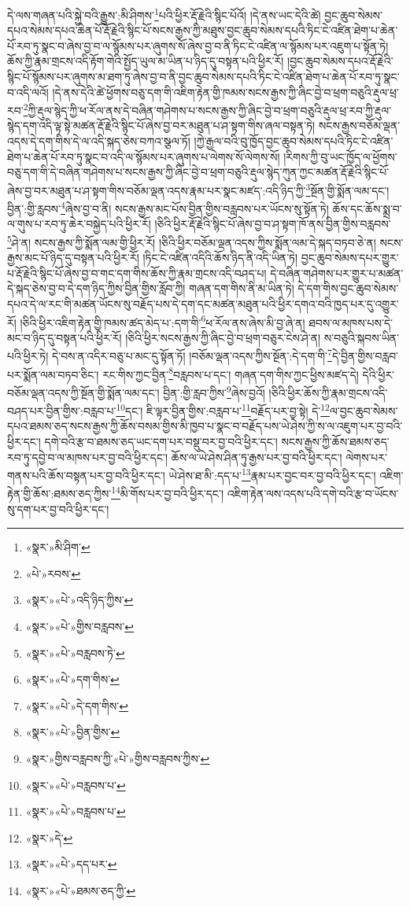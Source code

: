 དེ་ལས་གཞན་པའི་སྐྱེ་བའི་རྒྱུས་:མི་ཤིགས་\footnote{«སྣར་»མི་ཤིག་}པའི་ཕྱིར་རྡོ་རྗེའི་སྙིང་པོའོ། །དེ་ནས་ཡང་དེའི་ཚེ། བྱང་ཆུབ་སེམས་དཔའ་སེམས་དཔའ་ཆེན་པོ་རྡོ་རྗེའི་སྙིང་པོ་སངས་རྒྱས་ཀྱི་མཐུས་བྱང་ཆུབ་སེམས་དཔའི་ཏིང་ངེ་འཛིན་ཐེག་པ་ཆེན་པོ་རབ་ཏུ་སྣང་བ་ཞེས་བྱ་བ་ལ་སྙོམས་པར་ཞུགས་སོ་ཞེས་བྱ་བ་ནི་ཏིང་ངེ་འཛིན་ལ་སྙོམས་པར་འཇུག་པ་སྟོན་ཏེ། ཆོས་ཀྱི་རྣམ་གྲངས་འདི་རྟོག་གེའི་སྤྱོད་ཡུལ་མ་ཡིན་པ་ཉིད་དུ་བསྟན་པའི་ཕྱིར་རོ། །བྱང་ཆུབ་སེམས་དཔའ་རྡོ་རྗེའི་སྙིང་པོ་སྙོམས་པར་ཞུགས་མ་ཐག་ཏུ་ཞེས་བྱ་བ་ནི་བྱང་ཆུབ་སེམས་དཔའི་ཏིང་ངེ་འཛིན་ཐེག་པ་ཆེན་པོ་རབ་ཏུ་སྣང་བ་འདི་ལའོ། །དེ་ནས་དེའི་ཚེ་ཕྱོགས་བཅུ་དག་གི་འཇིག་རྟེན་གྱི་ཁམས་སངས་རྒྱས་ཀྱི་ཞིང་བྱེ་བ་ཕྲག་བཅུའི་རྡུལ་ཕྲ་རབ་\footnote{«པེ་»རབས་}ཀྱི་རྡུལ་སྙེད་ཀྱི་ཕ་རོལ་ནས་དེ་བཞིན་གཤེགས་པ་སངས་རྒྱས་ཀྱི་ཞིང་བྱེ་བ་ཕྲག་བཅུའི་རྡུལ་ཕྲ་རབ་ཀྱི་རྡུལ་སྙེད་དག་འདི་ལྟ་སྟེ་མཚན་རྡོ་རྗེའི་སྙིང་པོ་ཞེས་བྱ་བར་མཐུན་པ་ཤ་སྟག་གིས་ཞལ་བསྟན་ཏེ། སངས་རྒྱས་བཅོམ་ལྡན་འདས་དེ་དག་གིས་དེ་ལ་འདི་སྐད་ཅེས་བཀའ་སྩལ་ཏོ། །ཀྱེ་རྒྱལ་བའི་བུ་ཁྱོད་བྱང་ཆུབ་སེམས་དཔའི་ཏིང་ངེ་འཛིན་ཐེག་པ་ཆེན་པོ་རབ་ཏུ་སྣང་བ་འདི་ལ་སྙོམས་པར་ཞུགས་པ་ལེགས་སོ་ལེགས་སོ། །རིགས་ཀྱི་བུ་ཡང་ཁྱོད་ལ་ཕྱོགས་བཅུ་དག་གི་དེ་བཞིན་གཤེགས་པ་སངས་རྒྱས་ཀྱི་ཞིང་བྱེ་བ་ཕྲག་བཅུའི་རྡུལ་སྙེད་ཀུན་ཀྱང་མཚན་རྡོ་རྗེའི་སྙིང་པོ་ཞེས་བྱ་བར་མཐུན་པ་ཤ་སྟག་གིས་བཅོམ་ལྡན་འདས་རྣམ་པར་སྣང་མཛད་:འདི་ཉིད་ཀྱི་\footnote{«སྣར་»«པེ་»འདི་ཉིད་ཀྱིས་}སྔོན་གྱི་སྨོན་ལམ་དང་། བྱིན་:གྱི་རླབས་\footnote{«སྣར་»«པེ་»གྱིས་བརླབས་}ཞེས་བྱ་བ་ནི། སངས་རྒྱས་མང་པོས་བྱིན་གྱིས་བརླབས་པར་ཡོངས་སུ་སྟོན་ཏེ། ཆོས་དང་ཆོས་སྨྲ་བ་ལ་གུས་པ་རབ་ཏུ་ཆེར་བསྐྱེད་པའི་ཕྱིར་རོ། །ཅིའི་ཕྱིར་རྡོ་རྗེའི་སྙིང་པོ་ཞེས་བྱ་བ་ཤ་སྟག་ཁོ་ནས་བྱིན་གྱིས་བརླབས་\footnote{«སྣར་»«པེ་»བརླབས་ཏེ་}ཤེ་ན། སངས་རྒྱས་ཀྱི་སྨོན་ལམ་གྱི་ཕྱིར་རོ། །ཅིའི་ཕྱིར་བཅོམ་ལྡན་འདས་ཀྱིས་སྨོན་ལམ་དེ་སྐད་བཏབ་ཅེ་ན། སངས་རྒྱས་མང་པོ་ཉིད་དུ་བསྟན་པའི་ཕྱིར་རོ། །ཏིང་ངེ་འཛིན་འདིའི་ཆོས་ཉིད་ནི་འདི་ཡིན་ཏེ། བྱང་ཆུབ་སེམས་དཔར་གྱུར་པ་རྡོ་རྗེའི་སྙིང་པོ་ཞེས་བྱ་བ་གང་དག་གིས་ཆོས་ཀྱི་རྣམ་གྲངས་འདི་བཤད་པ། དེ་བཞིན་གཤེགས་པར་གྱུར་པ་མཚན་དེ་སྐད་ཅེས་བྱ་བ་དེ་དག་ཉིད་ཀྱིས་བྱིན་གྱིས་རློབ་ཀྱི། གཞན་དག་གིས་ནི་མ་ཡིན་ཏེ། དེ་དག་གིས་བྱང་ཆུབ་སེམས་དཔའ་དེ་ལ་རང་གི་མཚན་ཡོངས་སུ་བརྗོད་པས་དེ་དག་དང་མཚན་མཐུན་པའི་ཕྱིར་དགའ་བའི་ཁྱད་པར་དུ་འགྱུར་རོ། །ཅིའི་ཕྱིར་འཇིག་རྟེན་གྱི་ཁམས་ཚད་མེད་པ་:དག་གི་\footnote{«སྣར་»«པེ་»དག་གིས་}ཕ་རོལ་ནས་ཞེས་མི་བྱ་ཞེ་ན། ཐབས་ལ་མཁས་པས་དེ་མང་བ་ཉིད་དུ་བསྟན་པའི་ཕྱིར་རོ། །ཅིའི་ཕྱིར་སངས་རྒྱས་ཀྱི་ཞིང་བྱེ་བ་ཕྲག་བཅུར་ངེས་ཤེ་ན། ས་བཅུའི་སྐབས་ཡིན་པའི་ཕྱིར་ཏེ། དེ་བས་ན་འདིར་བཅུ་པ་མང་དུ་སྟོན་ཏོ། །བཅོམ་ལྡན་འདས་ཀྱིས་སྔོན་:དེ་དག་གི་\footnote{«སྣར་»«པེ་»དེ་དག་གིས་}དེ་བྱིན་གྱིས་བརླབ་པར་སྨོན་ལམ་བཏབ་ཅིང་། རང་གིས་ཀྱང་བྱིན་\footnote{«སྣར་»«པེ་»བྱིན་གྱིས་}བརླབས་པ་དང་། གཞན་དག་གིས་ཀྱང་ཕྱིས་མཛད་དེ། དེའི་ཕྱིར་བཅོམ་ལྡན་འདས་ཀྱི་སྔོན་གྱི་སྨོན་ལམ་དང་། བྱིན་:གྱི་རླབ་ཀྱིས་\footnote{«སྣར་»གྱིས་བརླབས་ཀྱི་«པེ་»གྱིས་བརླབས་ཀྱིས་}ཞེས་བྱའོ། །ཅིའི་ཕྱིར་ཆོས་ཀྱི་རྣམ་གྲངས་འདི་བཤད་པར་བྱིན་གྱིས་:བརླབ་པ་\footnote{«སྣར་»«པེ་»བརླབས་པ་}དང་། ཇི་ལྟར་བྱིན་གྱིས་:བརླབ་པ་\footnote{«སྣར་»«པེ་»བརླབས་པ་}བརྗོད་པར་བྱ་སྟེ། དེ་\footnote{«སྣར་»དེ་}ལ་བྱང་ཆུབ་སེམས་དཔའ་ཐམས་ཅད་སངས་རྒྱས་ཀྱི་ཆོས་བསམ་གྱིས་མི་ཁྱབ་པ་སྣང་བ་བརྗོད་པས་ཡེ་ཤེས་ཀྱི་ས་ལ་འཇུག་པར་བྱ་བའི་ཕྱིར་དང་། དགེ་བའི་རྩ་བ་ཐམས་ཅད་ཡང་དག་པར་བསྡུ་བར་བྱ་བའི་ཕྱིར་དང་། སངས་རྒྱས་ཀྱི་ཆོས་ཐམས་ཅད་རབ་ཏུ་དབྱེ་བ་ལ་མཁས་པར་བྱ་བའི་ཕྱིར་དང་། ཆོས་ལ་ཡེ་ཤེས་ཤིན་ཏུ་རྒྱས་པར་བྱ་བའི་ཕྱིར་དང་། ལེགས་པར་གནས་པའི་ཆོས་བསྟན་པར་བྱ་བའི་ཕྱིར་དང་། ཡེ་ཤེས་ཐ་མི་:དད་པ་\footnote{«སྣར་»«པེ་»དད་པར་}རྣམ་པར་བྱང་བར་བྱ་བའི་ཕྱིར་དང་། འཇིག་རྟེན་གྱི་ཆོས་:ཐམས་ཅད་ཀྱིས་\footnote{«སྣར་»«པེ་»ཐམས་ཅད་ཀྱི་}མི་གོས་པར་བྱ་བའི་ཕྱིར་དང་། འཇིག་རྟེན་ལས་འདས་པའི་དགེ་བའི་རྩ་བ་ཡོངས་སུ་དག་པར་བྱ་བའི་ཕྱིར་དང་། 